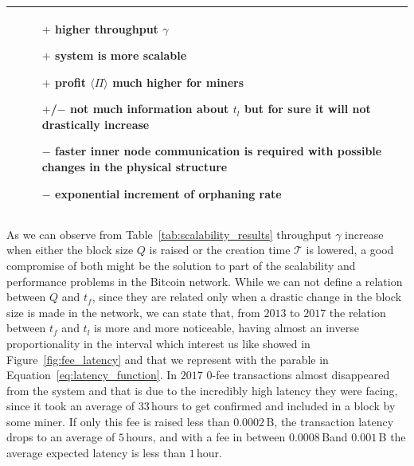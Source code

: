 \documentclass[USenglish]{uit-thesis}
\def\bitcoin{\leavevmode\rlap{\hskip.5pt-}B}
\begin{document}
\begin{table}
\begin{tabular}{|m{0.4cm}|m{4.8cm}|m{4.8cm}|}
\begin{itemize}
		\end{itemize}& \begin{itemize} %
		\item [$+$] higher throughput $\gamma$
		\item [$+$] system is more scalable
		\item [$+$] profit $\langle \Pi \rangle$ much higher for miners
		\item [$+$/$-$] not much information about $t_l$ but for sure it will not drastically increase
		\item [$-$] faster inner node communication is required with possible changes in the physical structure
		\item [$-$] exponential increment of orphaning rate
	\end{itemize}\\
		\hline
	\end{tabular}
\end{table}

As we can observe from Table~\ref{tab:scalability_results}
throughput $\gamma$ increase when either
the block size $Q$ is raised or the creation time
$\mathcal{T}$ is lowered, a good compromise of both
might be the solution to part of the scalability and
performance problems in the Bitcoin network.
While we can not define a relation between
$Q$ and $t_f$, since they are related only
when a drastic change in the block size is made
in the network, we can state that, from
$2013$ to $2017$ the relation between $t_f$
and $t_l$ is more and more noticeable, having
almost an inverse proportionality in the interval which
interest us like showed in
Figure~\ref{fig:fee_latency} and that we represent
with the parable in Equation~\ref{eq:latency_function}.
In $2017$ $0$-fee transactions almost disappeared from
the system and that is due to the incredibly high
latency they were facing, since it took
an average of $33$\,hours to
get confirmed and included in a block
by some miner. If only this fee is raised
less than $0.0002$\,\bitcoin,
the transaction latency drops to an average
of $5$\,hours, and with a fee in between
$0.0008$\,\bitcoin and $0.001$\,\bitcoin
the average expected latency is less than
$1$\,hour.
\end{document}
